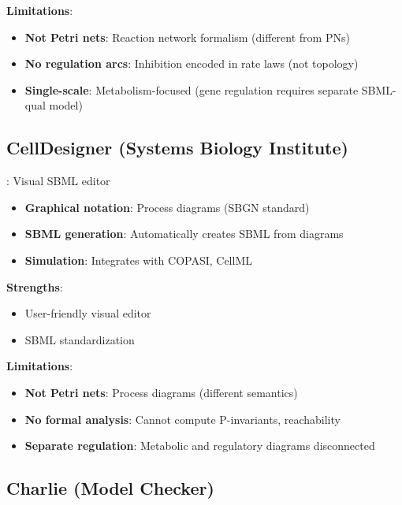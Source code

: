 \textbf{Limitations}:

\begin{itemize}
    \item \textbf{Not Petri nets}: Reaction network formalism (different from PNs)
    \item \textbf{No regulation arcs}: Inhibition encoded in rate laws (not topology)
    \item \textbf{Single-scale}: Metabolism-focused (gene regulation requires separate SBML-qual model)
\end{itemize}

\subsection{CellDesigner (Systems Biology Institute)}
\label{subsec:celldesigner}

\textbf{\citet{Funahashi2003}}: Visual SBML editor

\begin{itemize}
    \item \textbf{Graphical notation}: Process diagrams (SBGN standard)
    \item \textbf{SBML generation}: Automatically creates SBML from diagrams
    \item \textbf{Simulation}: Integrates with COPASI, CellML
\end{itemize}

\textbf{Strengths}:

\begin{itemize}
    \item User-friendly visual editor
    \item SBML standardization
\end{itemize}

\textbf{Limitations}:

\begin{itemize}
    \item \textbf{Not Petri nets}: Process diagrams (different semantics)
    \item \textbf{No formal analysis}: Cannot compute P-invariants, reachability
    \item \textbf{Separate regulation}: Metabolic and regulatory diagrams disconnected
\end{itemize}

\subsection{Charlie (Model Checker)}
\label{subsec:charlie}

